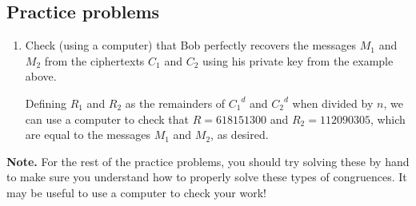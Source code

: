 \documentclass[11pt]{article}
\theoremstyle{plain}
\theoremstyle{definition}
\begin{document}
\subsection*{Practice problems}
 
\begin{enumerate}%
 \item Check (using a computer) that Bob perfectly recovers the messages $M_1$ and $M_2$ from the ciphertexts $C_1$ and $C_2$ using his private key from the example above.
 \begin{Solution}
  Defining $R_1$ and $R_2$ as the remainders of ${C_1}^d$ and ${C_2}^d$ when divided by $n$, we can use a computer to check that \href{https://www.wolframalpha.com/input/?i=1643373961\%5E4556889293+mod+2848169993}{$R=618151300$} and \href{https://www.wolframalpha.com/input/?i=2028678151\%5E4556889293+mod+2848169993}{$R_2=112090305$}, which are equal to the messages $M_1$ and $M_2$, as desired. 
 \end{Solution}

 \end{enumerate}

 
 \noindent \textbf{Note.} For the rest of the practice problems, you should try solving these by hand to make sure you understand how to properly solve these types of congruences. It may be useful to use a computer to check your work!
 
\end{document}
